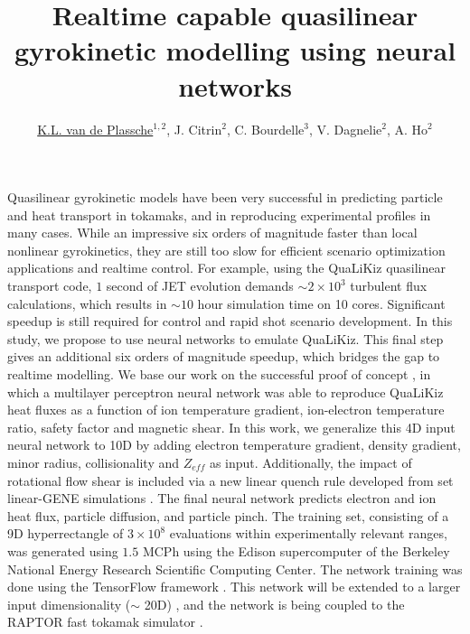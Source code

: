 \documentclass{epsconf}
\title{Realtime capable quasilinear gyrokinetic modelling using neural networks}
\author{\underline{K.L. van de Plassche}$^{1,2}$, J. Citrin$^2$, C. Bourdelle$^3$, V. Dagnelie$^2$, A. Ho$^2$}
\institute{$^1$ University of Technology Eindhoven, PO Box 513, 5600 MB Eindhoven, The Netherlands\\
$^2$ DIFFER, PO Box 6336, 5600 HH Eindhoven, The Netherlands\\
$^3$ CEA, IRFM, F-13108 Saint-Paul-lez-Durance, France.}
\begin{document}
\maketitle
Quasilinear gyrokinetic models have been very successful in predicting particle and heat transport in tokamaks, and in reproducing experimental profiles in many cases. While an impressive six orders of magnitude faster than local nonlinear gyrokinetics, they are still too slow for efficient scenario optimization applications and realtime control. For example, using the QuaLiKiz \cite{qualikiz} quasilinear transport code, $1$ second of JET evolution demands $\sim 2 \times 10^3$ turbulent flux calculations, which results in $\sim 10$ hour simulation time on 10 cores. Significant speedup is still required for control and rapid shot scenario development.\newline \indent
In this study, we propose to use neural networks to emulate QuaLiKiz. This final step gives an additional six orders of magnitude speedup, which bridges the gap to realtime modelling. We base our work on the successful proof of concept \cite{qlknn}, in which a multilayer perceptron neural network was able to reproduce QuaLiKiz heat fluxes as a function of ion temperature gradient, ion-electron temperature ratio, safety factor and magnetic shear. In this work, we generalize this 4D input neural network to 10D by adding electron temperature gradient, density gradient, minor radius, collisionality and $Z_{eff}$ as input. Additionally, the impact of rotational flow shear is included via a new linear quench rule developed from set linear-GENE simulations \cite{gene}. The final neural network predicts electron and ion heat flux, particle diffusion, and particle pinch.\newline \indent
The training set, consisting of a 9D hyperrectangle of $3 \times 10^8$ evaluations within experimentally relevant ranges, was generated using $1.5$ MCPh using the Edison supercomputer of the Berkeley National Energy Research Scientific Computing Center. The network training was done using the TensorFlow framework \cite{tflow}. This network will be extended to a larger input dimensionality ($\sim$ 20D) \cite{ho}, and the network is being coupled to the RAPTOR fast tokamak simulator \cite{raptor}.
\end{document}
